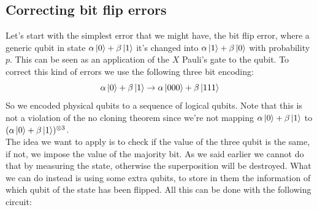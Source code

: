 \documentclass{article}
\begin{document}
	\subsection{Correcting bit flip errors}
	Let's start with the simplest error that we might have, the bit flip error, where a generic qubit in state $\alpha\ket{0} + \beta\ket{1}$ it's changed into $\alpha\ket{1} + \beta\ket{0}$ with probability $p$. This can be seen as an application of the $X$ Pauli's gate to the qubit. To correct this kind of errors we use the following three bit encoding:
	\[ \alpha\ket{0} + \beta\ket{1} \rightarrow \alpha\ket{000} + \beta\ket{111}\]
	So we encoded physical qubits to a sequence of logical qubits. Note that this is not a violation of the no cloning theorem since we're not mapping $\alpha\ket{0} + \beta\ket{1}$ to $(\alpha\ket{0} + \beta\ket{1})^{\otimes3}$. \\
	The idea we want to apply is to check if the value of the three qubit is the same, if not, we impose the value of the majority bit. As we said earlier we cannot do that by measuring the state, otherwise the superposition will be destroyed. What we can do instead is using some extra qubits, to store in them the information of which qubit of the state has been flipped. All this can be done with the following circuit:
	
	\begin{figure}[H]
	\centering
	\end{figure}
	
\end{document}
